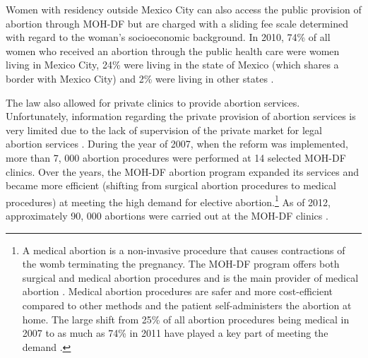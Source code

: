 \documentclass[a4paper, 11pt]{article}
\begin{document}
\begin{spacing}{2}
Women with residency outside Mexico City can also access the public provision of abortion through MOH-DF but are charged with a sliding fee scale determined with regard to the woman's socioeconomic background. In 2010, 74\% of all women who received an abortion through the public health care were women living in Mexico City, 24\% were living in the state of Mexico (which shares a border with Mexico City) and 2\% were living in other states \citep{Kalb}.

The law also allowed for private clinics to provide abortion services. Unfortunately, information regarding the private provision of abortion services is very limited due to the lack of supervision of the private market for legal abortion services \citep{Becker}. During the year of 2007, when the reform was implemented, more than 7, 000 abortion procedures were performed at 14 selected MOH-DF clinics. Over the years, the MOH-DF abortion program expanded its services and became more efficient (shifting from surgical abortion procedures to medical procedures) at meeting the high demand for elective abortion.\footnote{A medical abortion is a non-invasive procedure that causes contractions of the womb terminating the pregnancy. The MOH-DF program offers both surgical and medical abortion procedures and is the main provider of medical abortion \citep{WinikoffSheldon2012}. Medical abortion procedures are safer and more cost-efficient compared to other methods and the patient self-administers the abortion at home. The large shift from 25\% of all abortion procedures being medical in 2007 to as much as 74\% in 2011 have played a key part of meeting the demand \citep{Becker}.} As of 2012, approximately 90, 000 abortions were carried out at the MOH-DF clinics \citep{Becker}.  


\end{spacing}
\end{document}
